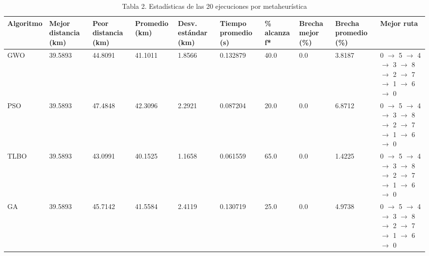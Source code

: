 \begin{table}[htbp]
  \centering
  \caption{Tabla 2. Estadísticas de las 20 ejecuciones por metaheurística}
  \label{tab:tabla-2-estadisticas-metaheuristicas}
  \begin{tabular}{llllllllll}
    \toprule
    Algoritmo & Mejor distancia (km) & Peor distancia (km) & Promedio (km) & Desv. estándar (km) & Tiempo promedio (s) & \% alcanza f* & Brecha mejor (\%) & Brecha promedio (\%) & Mejor ruta \\
    \midrule
    GWO & 39.5893 & 44.8091 & 41.1011 & 1.8566 & 0.132879 & 40.0 & 0.0 & 3.8187 & 0 $\rightarrow$ 5 $\rightarrow$ 4 $\rightarrow$ 3 $\rightarrow$ 8 $\rightarrow$ 2 $\rightarrow$ 7 $\rightarrow$ 1 $\rightarrow$ 6 $\rightarrow$ 0 \\
    PSO & 39.5893 & 47.4848 & 42.3096 & 2.2921 & 0.087204 & 20.0 & 0.0 & 6.8712 & 0 $\rightarrow$ 5 $\rightarrow$ 4 $\rightarrow$ 3 $\rightarrow$ 8 $\rightarrow$ 2 $\rightarrow$ 7 $\rightarrow$ 1 $\rightarrow$ 6 $\rightarrow$ 0 \\
    TLBO & 39.5893 & 43.0991 & 40.1525 & 1.1658 & 0.061559 & 65.0 & 0.0 & 1.4225 & 0 $\rightarrow$ 5 $\rightarrow$ 4 $\rightarrow$ 3 $\rightarrow$ 8 $\rightarrow$ 2 $\rightarrow$ 7 $\rightarrow$ 1 $\rightarrow$ 6 $\rightarrow$ 0 \\
    GA & 39.5893 & 45.7142 & 41.5584 & 2.4119 & 0.130719 & 25.0 & 0.0 & 4.9738 & 0 $\rightarrow$ 5 $\rightarrow$ 4 $\rightarrow$ 3 $\rightarrow$ 8 $\rightarrow$ 2 $\rightarrow$ 7 $\rightarrow$ 1 $\rightarrow$ 6 $\rightarrow$ 0 \\
    \bottomrule
  \end{tabular}
\end{table}
